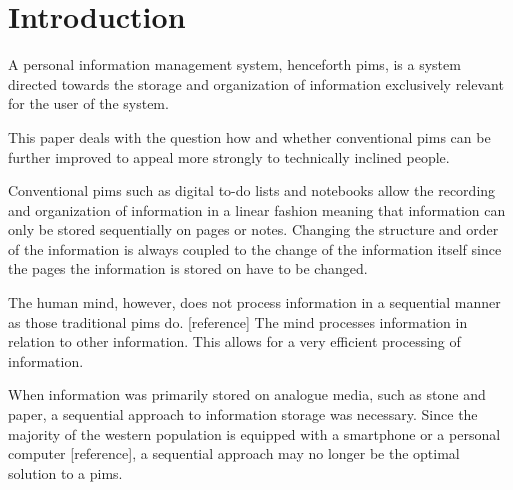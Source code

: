 \section{Introduction}

A personal information management system, henceforth \gls{pims}, is a system
directed towards the storage and organization of information exclusively
relevant for the user of the system.

This paper deals with the question how and whether conventional \gls{pims}
can be further improved to appeal more strongly to technically inclined
people.

Conventional \gls{pims} such as digital to-do lists and notebooks allow the
recording and organization of information in a linear fashion meaning that
information can only be stored sequentially on pages or notes. Changing the
structure and order of the information is always coupled to the change of the
information itself since the pages the information is stored on have to be
changed.

The human mind, however, does not process information in a sequential manner
as those traditional \gls{pims} do. [reference] The mind processes information
in relation to other information. This allows for a very efficient processing
of information.

When information was primarily stored on analogue media, such as stone and
paper, a sequential approach to information storage was necessary. Since the
majority of the western population is equipped with a smartphone or a personal
computer [reference], a sequential approach may no longer be the optimal
solution to a \gls{pims}.
\iffalse
0 problem
1st problem
2nd introduction / storyline why not optimal
3rd criteria of possible solution
4rd proposition
5 conclusion / why system more optimal / research question
\fi
